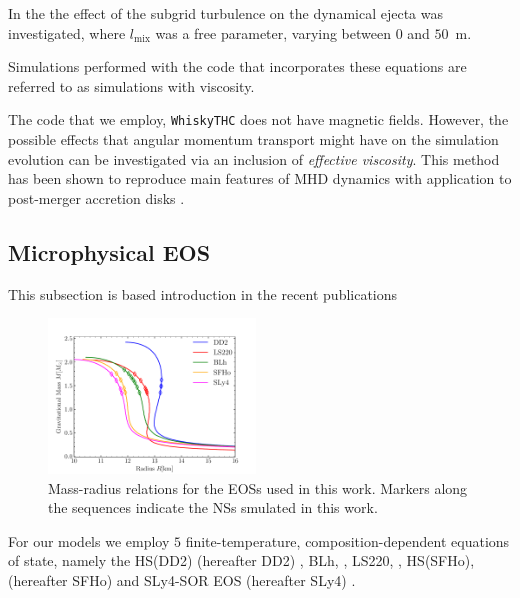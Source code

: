 \documentclass[11pt,a4paper,headinclude=true,DIV=14,BCOR=8mm,chapterprefix,listof=totoc,twoside,openright,abstracton]{scrbook}
\begin{document}
In the \cite{Radice:2017lry} the effect of the subgrid turbulence on the dynamical ejecta was investigated, where $l_{\text{mix}}$ was a free parameter, varying between $0$ and $50$~m. 

Simulations performed with the code that incorporates these equations are referred to as simulations
with viscosity.

The code that we employ, \texttt{WhiskyTHC} does not have magnetic fields. 
However, the possible effects that angular momentum transport might have on the simulation evolution
can be investigated via an inclusion of \textit{effective viscosity}.
This method has been shown to reproduce main features of MHD dynamics with application to post-merger accretion
disks \cite{Fernandez:2018kax}.


\subsection{Microphysical EOS}



This subsection is based introduction in the recent publications 
\cite{Radice:2018pdn,Perego:2019adq,Bernuzzi:2020txg,Nedora:2020pak}

\begin{figure}[t]
    \centering 
    \includegraphics[width=0.49\textwidth]{./figs/tov_mr.pdf}
    \caption{Mass-radius relations for the EOSs used in this work. 
        Markers along the sequences indicate the NSs smulated in this work.}  
    \label{fig:method:tov_mr}
\end{figure}

For our models we employ $5$ finite-temperature, composition-dependent equations of state, namely the 
HS(DD2) (hereafter DD2) \cite{Typel:2009sy,Hempel:2009mc}, 
BLh, \cite{Bombaci:2018ksa}, 
LS220, \cite{Lattimer:1991nc}, 
HS(SFHo), (hereafter SFHo) \cite{Steiner:2012rk} and 
SLy4-SOR EOS (hereafter SLy4) \cite{daSilvaSchneider:2017jpg}.
\end{document}
